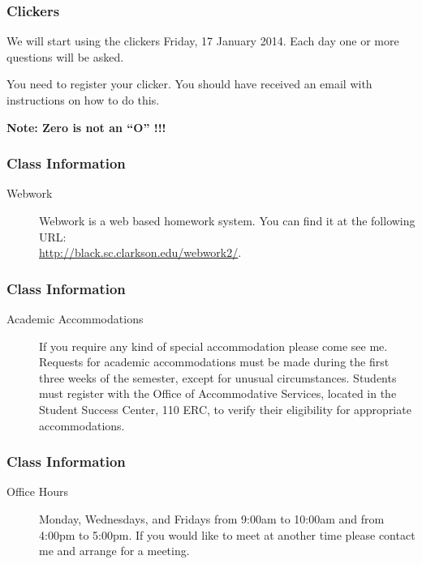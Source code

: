 \begin{frame}
  \frametitle{Clickers}

  We will start using the clickers Friday, 17 January 2014. Each day
  one or more questions will be asked.

  You need to register your clicker. You should have received an email
  with instructions on how to do this. 

  \textbf{Note: Zero is not an ``O''  !!!}
  
\end{frame}


\begin{frame}
  \frametitle{Class Information}

\begin{description}
  \item[Webwork] Webwork is a web based homework system. You can find
    it at the following URL: \\
    \url{http://black.sc.clarkson.edu/webwork2/}.
\end{description}

\end{frame}


\begin{frame}
  \frametitle{Class Information}

\begin{description}
  \item[Academic Accommodations] If you require any kind of special
    accommodation please come see me.  Requests for academic
    accommodations must be made during the first three weeks of the
    semester, except for unusual circumstances.  Students must
    register with the Office of Accommodative Services, located in the
    Student Success Center, 110 ERC, to verify their eligibility for
    appropriate accommodations.


\end{description}


\end{frame}

\begin{frame}
  \frametitle{Class Information}

\begin{description}
\item[Office Hours] Monday, Wednesdays, and Fridays from 9:00am to
  10:00am and from 4:00pm to 5:00pm.  If you would like to meet at
  another time please contact me and arrange for a meeting.

\end{description}


\end{frame}

